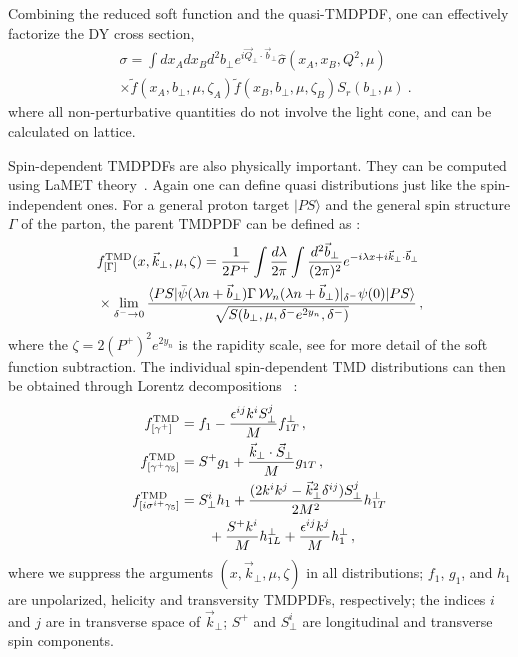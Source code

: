 Combining the reduced soft function and the quasi-TMDPDF, one can effectively factorize the DY cross section,
\begin{align}
	&\sigma = \int dx_A dx_B d^2b_\perp e^{i\vec{Q}_\perp \cdot \vec{b}_\perp}\hat \sigma(x_A,x_B,Q^2,\mu)\nonumber \\ &\times \tilde f(x_A,b_\perp,\mu,\zeta_A) \tilde f(x_B,b_\perp,\mu,\zeta_B) S_r(b_\perp,\mu) \ .
\end{align}
where all non-perturbative quantities do not involve the light cone,
and can be calculated on lattice.

Spin-dependent TMDPDFs are also physically important. They can be computed
using LaMET theory~\cite{Ebert:2020gxr}. Again one can define quasi distributions just like the spin-independent ones.
For a general proton target $|PS\rangle$ and the general spin structure $\Gamma$ of the parton, the parent TMDPDF can be defined as :
\begin{align}\label{eq:parent_TMD}
	&f_{[\Gamma]}^{\rm TMD}(x,\vec{k}_\perp,\mu,\zeta)=\frac{1}{2P^+}\int\frac{d\lambda}{2\pi}\int\frac{d^2 \vec{b}_\perp}{(2\pi)^2}e^{-i\lambda x + i\vec{k}_\perp\cdot \vec{b}_\perp}\nonumber\\
	&\times \lim_{\delta^- \rightarrow 0}\frac{\langle PS|\bar\psi(\lambda n+\vec{b}_\perp)\Gamma\, {\cal W}_n(\lambda n +\vec{b}_\perp)|_{\delta^-}\psi(0)|PS\rangle}{\sqrt{S(b_\perp,\mu,\delta^-e^{2y_n},\delta^-)}} \,,
\end{align}
where the $\zeta=2(P^+)^2e^{2y_n}$ is the rapidity scale, see  for more detail of the soft function subtraction. The individual spin-dependent TMD distributions can then be obtained through Lorentz decompositions ~\cite{Tangerman:1994eh,Ralston:1979ys,Mulders:1995dh}:
\begin{align}\label{eq:TMDPDF}
	f_{[\gamma^+]}^{\rm TMD}&=f_1-\frac{\epsilon^{ij}k^i S^j_\perp}{M}f_{1T}^\perp   \,,\\
	f_{[\gamma^+\gamma_5]}^{\rm TMD}&=S^+ g_1+\frac{\vec{k}_\perp\cdot \vec{S}_\perp}{M}g_{1T} \,, \\
	f_{[i\sigma^{i+}\gamma_5]}^{\rm TMD}&=S_\perp^i h_1+\frac{(2k^i k^j-\vec{k}_\perp^2\delta^{ij})S^j_\perp}{2M^2}h_{1T}^\perp\nonumber\\
	&\qquad+\frac{S^+ k^i}{M}h_{1L}^\perp+\frac{\epsilon^{ij} k^j}{M}h_1^\perp \,,
\end{align}
where we suppress the arguments $(x,\vec{k}_\perp,\mu,\zeta)$ in all distributions;
$f_1$, $g_1$, and $h_1$ are unpolarized, helicity and transversity TMDPDFs, respectively;
the indices $i$ and $j$ are in transverse space of $\vec{k}_\perp$; $S^+$ and $S^i_\perp$ are longitudinal and transverse spin components.

